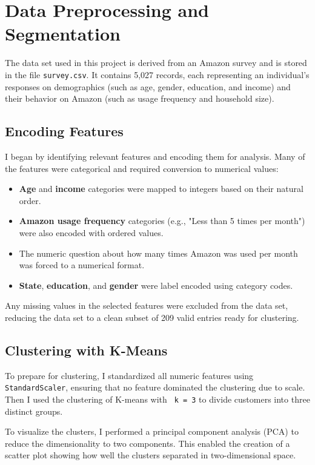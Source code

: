 \documentclass[12pt]{article}
\begin{document}
\section{Data Preprocessing and Segmentation}

The data set used in this project is derived from an Amazon survey and is stored in the file \texttt{survey.csv}. It contains 5,027 records, each representing an individual's responses on demographics (such as age, gender, education, and income) and their behavior on Amazon (such as usage frequency and household size).

\subsection*{Encoding Features}
I began by identifying relevant features and encoding them for analysis. Many of the features were categorical and required conversion to numerical values:

\begin{itemize}
    \item \textbf{Age} and \textbf{income} categories were mapped to integers based on their natural order.
    \item \textbf{Amazon usage frequency} categories (e.g., "Less than 5 times per month") were also encoded with ordered values.
    \item The numeric question about how many times Amazon was used per month was forced to a numerical format.
    \item \textbf{State}, \textbf{education}, and \textbf{gender} were label encoded using category codes.
\end{itemize}

Any missing values in the selected features were excluded from the data set, reducing the data set to a clean subset of 209 valid entries ready for clustering.

\subsection*{Clustering with K-Means}
To prepare for clustering, I standardized all numeric features using \texttt{StandardScaler}, ensuring that no feature dominated the clustering due to scale. Then I used the clustering of K-means with \texttt{ k = 3} to divide customers into three distinct groups.

To visualize the clusters, I performed a principal component analysis (PCA) to reduce the dimensionality to two components. This enabled the creation of a scatter plot showing how well the clusters separated in two-dimensional space.
\end{document}
